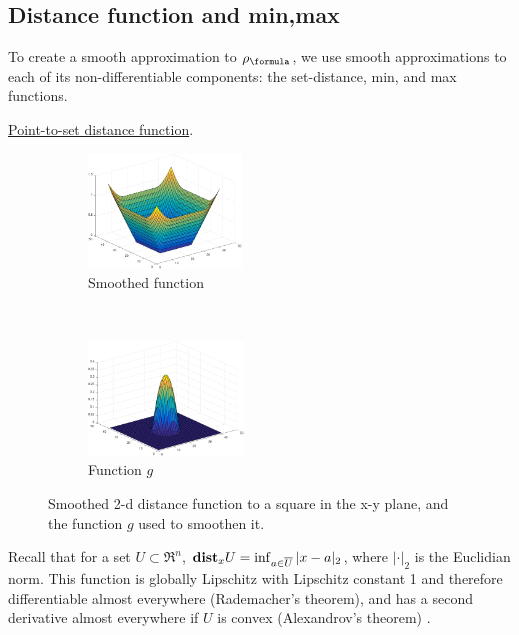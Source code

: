\subsection{Distance function and min,max}
\label{sec:dist max smoothing}
To create a smooth approximation to $\robf$, we use smooth approximations to each of its non-differentiable components: the set-distance, min, and max functions.

\underline{Point-to-set distance function}.
\begin{figure}[t!]
	\centering
	\begin{subfigure}[t]{0.25\textwidth}
		\includegraphics[height=1.2in]{figures/smoothDist2d}
		\caption{Smoothed function}
	\end{subfigure}%
	~
	\begin{subfigure}[t]{0.25\textwidth}
		\includegraphics[height=1.2in]{figures/kernelG}
		\caption{Function $g$}
	\end{subfigure}
	\caption{Smoothed 2-d distance function to a square in the x-y plane, and the function $g$ used to smoothen it.}
	\label{fig:smooth2d}
\end{figure}

Recall that for a set $U \subset \Re^n$, $\mathbf{dist}_{x}{U} = \inf_{a \in \overline{U}} |x-a|_2$, where $|\cdot|_2$ is the Euclidian norm.
This function is globally Lipschitz with Lipschitz constant 1 and therefore differentiable almost everywhere (Rademacher's theorem), and has a second derivative almost everywhere if $U$ is convex (Alexandrov's theorem) \cite{MakelaN92book}.

